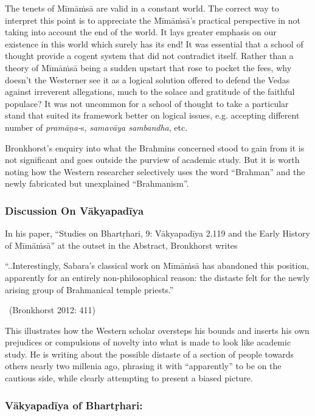 The tenets of Mīmāṁsā are valid in a constant world. The correct way to interpret this point is to appreciate the Mīmāṁsā’s practical perspective in not taking into account the end of the world. It lays greater emphasis on our existence in this world which surely has its end! It was essential that a school of thought provide a cogent system that did not contradict itself. Rather than a theory of Mīmāṁsā being a sudden upstart that rose to pocket the fees, why doesn’t the Westerner see it as a logical solution offered to defend the Vedas against irreverent allegations, much to the solace and gratitude of the faithful populace? It was not uncommon for a school of thought to take a particular stand that suited its framework better on logical issues, e.g. accepting different number of \textit{pramāṇa-}s, \textit{samavāya sambandha}, etc.

Bronkhorst’s enquiry into what the Brahmins concerned stood to gain from it is not significant and goes outside the purview of academic study. But it is worth noting how the Western researcher selectively uses the word “Brahman” and the newly fabricated but unexplained “Brahmanism”.

\vspace{-.3cm}

\subsubsection*{Discussion On Vākyapadīya}

In his paper, “Studies on Bhartṛhari, 9: Vākyapadīya 2.119 and the Early History of Mīmāṁsā” at the outset in the Abstract, Bronkhorst writes

\begin{myquote}
“..Interestingly, Sabara’s classical work on Mīmāṁsā has abandoned this position, apparently for an entirely non-philosophical reason: the distaste felt for the newly arising group of Brahmanical temple priests.” 

~\hfill (Bronkhorst 2012: 411)
\end{myquote}

This illustrates how the Western scholar oversteps his bounds and inserts his own prejudices or compulsions of novelty into what is made to look like academic study. He is writing about the possible distaste of a section of people towards others nearly two millenia ago, phrasing it with “apparently” to be on the cautious side, while clearly attempting to present a biased picture.


\subsubsection*{Vākyapadīya of Bhartṛhari:}

